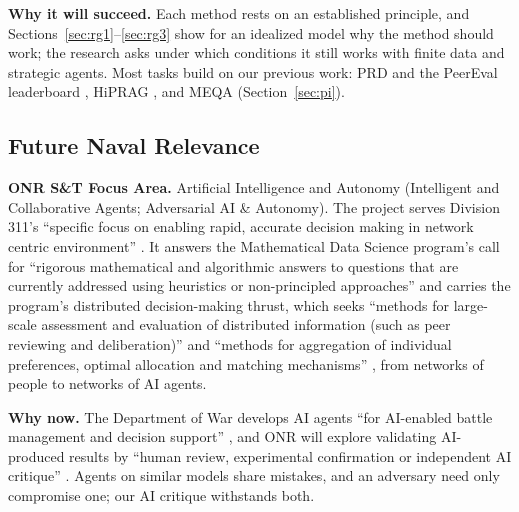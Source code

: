 \documentclass[12pt,letterpaper]{article}
\newcommand{\hd}[1]{\ifhmode\par\fi\addvspace{1pt}\noindent\textbf{#1}\hspace{0.35em}}
\begin{document}
\hd{Why it will succeed.} Each method rests on an established principle, and Sections~\ref{sec:rg1}--\ref{sec:rg3} show for an idealized model why the method should work; the research asks under which conditions it still works with finite data and strategic agents. Most tasks build on our previous work: PRD and the PeerEval leaderboard \citep{li2024prd}, HiPRAG \citep{wu2026hiprag}, and MEQA \citep{li2024meqa} (Section~\ref{sec:pi}).

\subsection{Future Naval Relevance}\label{sec:naval}
\hd{ONR S\&T Focus Area.} Artificial Intelligence and Autonomy (Intelligent and Collaborative Agents; Adversarial AI \& Autonomy). The project serves Division 311's ``specific focus on enabling rapid, accurate decision making in network centric environment'' \citep{onr2026mcis}. It answers the Mathematical Data Science program's call for ``rigorous mathematical and algorithmic answers to questions that are currently addressed using heuristics or non-principled approaches'' \citep{onr2026mds} and carries the program's distributed decision-making thrust, which seeks ``methods for large-scale assessment and evaluation of distributed information (such as peer reviewing and deliberation)'' and ``methods for aggregation of individual preferences, optimal allocation and matching mechanisms'' \citep{onr2026lsddm}, from networks of people to networks of AI agents.

\hd{Why now.} The Department of War develops AI agents ``for AI-enabled battle management and decision support'' \citep{dow2026aistrategy}, and ONR will explore validating AI-produced results by ``human review, experimental confirmation or independent AI critique'' \citep{onr2026strategy}. Agents on similar models share mistakes, and an adversary need only compromise one; our AI critique withstands both.
\end{document}
